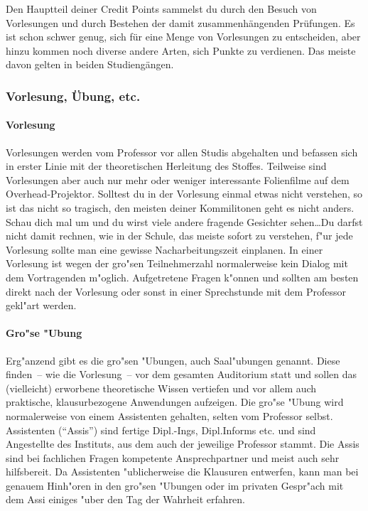 \begin{multicols}{2}

Den Hauptteil deiner  Credit Points sammelst du durch den Besuch von
Vorlesungen und durch Bestehen der damit zusammenhängenden Prüfungen. Es
ist schon schwer genug, sich für eine Menge von Vorlesungen zu
entscheiden, aber hinzu kommen noch diverse andere Arten, sich Punkte zu
verdienen. Das meiste davon gelten in beiden Studiengängen.
\subsubsection{Vorlesung, Übung, etc.}
\paragraph*{Vorlesung}

Vorlesungen werden vom Professor vor allen Studis abgehalten und befassen
sich in erster Linie mit der theoretischen Herleitung des Stoffes. Teilweise
sind Vorlesungen aber auch nur mehr oder weniger interessante Folienfilme auf
dem Overhead-Projektor. Solltest du in der Vorlesung einmal etwas nicht
verstehen, so ist das nicht so tragisch, den meisten deiner Kommilitonen geht
es nicht anders. Schau dich mal um und du wirst viele andere fragende Gesichter
sehen\ldots Du darfst nicht damit rechnen, wie in der Schule, das meiste sofort zu
verstehen, f"ur jede Vorlesung sollte man eine gewisse Nacharbeitungszeit
einplanen. In einer Vorlesung ist wegen der gro"sen Teilnehmerzahl
normalerweise kein Dialog mit dem Vortragenden m"oglich. Aufgetretene Fragen
k"onnen und sollten am besten direkt nach der Vorlesung oder sonst in einer
Sprechstunde mit dem Professor gekl"art werden.


\paragraph*{Gro"se "Ubung}

Erg"anzend gibt es die gro"sen "Ubungen, auch Saal"ubungen genannt. Diese
finden~-- wie die Vorlesung~-- vor dem gesamten Auditorium statt und sollen das
(vielleicht) erworbene theoretische Wissen vertiefen und vor allem auch
praktische, klausurbezogene Anwendungen aufzeigen. Die gro"se "Ubung wird
normalerweise von einem Assistenten gehalten, selten vom Professor selbst.
Assistenten ("`Assis"') sind fertige Dipl.-Ings, Dipl.Informs etc. und sind
Angestellte des Instituts, aus dem auch der jeweilige Professor stammt. Die
Assis sind bei fachlichen Fragen kompetente Ansprechpartner und meist auch sehr
hilfsbereit. Da Assistenten "ublicherweise die Klausuren entwerfen, kann man
bei genauem Hinh"oren in den gro"sen "Ubungen oder im privaten Gespr"ach mit
dem Assi einiges "uber den Tag der Wahrheit erfahren.



\end{multicols}
